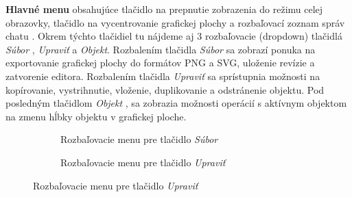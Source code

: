 \textbf{Hlavné menu} obsahujúce tlačidlo na prepnutie zobrazenia do režimu celej obrazovky, tlačidlo na vycentrovanie grafickej plochy a rozbaľovací zoznam správ chatu . Okrem týchto tlačidiel tu nájdeme aj 3 rozbaľovacie (dropdown) tlačidlá \textit{Súbor} , \textit{Upraviť} a \textit{Objekt}. Rozbalením tlačidla \textit{Súbor}  sa zobrazí ponuka na exportovanie grafickej plochy do formátov PNG a SVG, uloženie revízie a zatvorenie editora. Rozbalením tlačidla \textit{Upraviť}  sa sprístupnia možnosti na kopírovanie, vystrihnutie, vloženie, duplikovanie a odstránenie objektu. Pod posledným tlačidlom \textit{Objekt} , sa zobrazia možnosti operácií s aktívnym objektom na zmenu hĺbky objektu v grafickej ploche.
\begin{figure}[H]
	\centering
	\begin{subfigure}[t]{0.48\linewidth}	
		\caption{Rozbaľovacie menu pre tlačidlo \textit{Súbor}}
		\label{obr:menu-file}
	\end{subfigure}
	\quad
	\begin{subfigure}[t]{0.48\linewidth}	
		\caption{Rozbaľovacie menu pre tlačidlo \textit{Upraviť}}
		\label{obr:menu-edit}
	\end{subfigure}

\end{figure}
